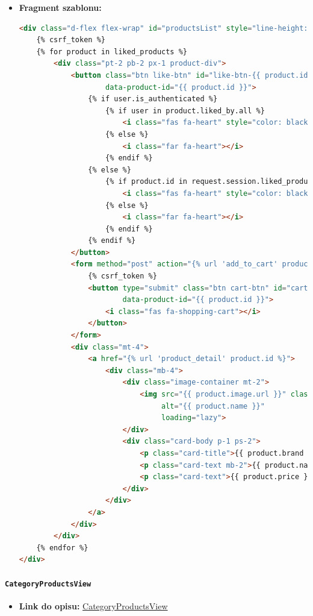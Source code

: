 \documentclass[12pt,a4paper,oneside]{article}
\theoremstyle{definition}
\numberwithin{equation}{section}
\begin{document}
\begin{itemize}
    \item \textbf{Fragment szablonu:}
        \begin{lstlisting}[language=HTML, caption=Fragment szablonu favorites.html]
<div class="d-flex flex-wrap" id="productsList" style="line-height: 1.3;">
    {% csrf_token %}
    {% for product in liked_products %}
        <div class="pt-2 pb-2 px-1 product-div">
            <button class="btn like-btn" id="like-btn-{{ product.id }}"
                    data-product-id="{{ product.id }}">
                {% if user.is_authenticated %}
                    {% if user in product.liked_by.all %}
                        <i class="fas fa-heart" style="color: black;"></i>
                    {% else %}
                        <i class="far fa-heart"></i>
                    {% endif %}
                {% else %}
                    {% if product.id in request.session.liked_products %}
                        <i class="fas fa-heart" style="color: black;"></i>
                    {% else %}
                        <i class="far fa-heart"></i>
                    {% endif %}
                {% endif %}
            </button>
            <form method="post" action="{% url 'add_to_cart' product.id %}" class="d-inline">
                {% csrf_token %}
                <button type="submit" class="btn cart-btn" id="cart-btn-{{ product.id }}"
                        data-product-id="{{ product.id }}">
                    <i class="fas fa-shopping-cart"></i>
                </button>
            </form>
            <div class="mt-4">
                <a href="{% url 'product_detail' product.id %}">
                    <div class="mb-4">
                        <div class="image-container mt-2">
                            <img src="{{ product.image.url }}" class="card-img-top"
                                 alt="{{ product.name }}"
                                 loading="lazy">
                        </div>
                        <div class="card-body p-1 ps-2">
                            <p class="card-title">{{ product.brand }}</p>
                            <p class="card-text mb-2">{{ product.name }}</p>
                            <p class="card-text">{{ product.price }} zl</p>
                        </div>
                    </div>
                </a>
            </div>
        </div>
    {% endfor %}
</div>
        \end{lstlisting}
\end{itemize}

\paragraph{\texttt{CategoryProductsView}}
\begin{itemize}
    \item \textbf{Link do opisu: }\hyperref[CategoryProductsView]{CategoryProductsView}
\end{itemize}
\end{document}
